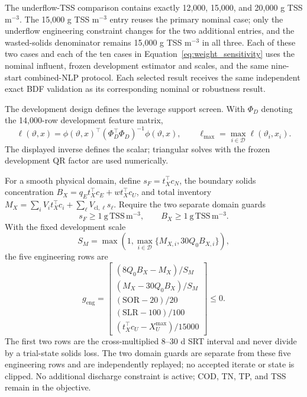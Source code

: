 \documentclass[a4paper,fleqn]{cas-sc}
\begin{document}
The underflow-TSS comparison contains exactly 12,000, 15,000, and 20,000 g TSS m$^{-3}$. The 15,000 g TSS m$^{-3}$ entry reuses the primary nominal case; only the underflow engineering constraint changes for the two additional entries, and the wasted-solids denominator remains 15,000 g TSS m$^{-3}$ in all three. Each of these two cases and each of the ten cases in Equation~\eqref{eq:weight_sensitivity} uses the nominal influent, frozen development estimator and scales, and the same nine-start combined-NLP protocol. Each selected result receives the same independent exact BDF validation as its corresponding nominal or robustness result.

The development design defines the leverage support screen. With $\Phi_D$ denoting the 14,000-row development feature matrix,
\begin{equation}
\label{eq:leverage_screen}
\ell(\vartheta,x)=\phi(\vartheta,x)^\top(\Phi_D^\top\Phi_D)^{-1}\phi(\vartheta,x),
\qquad
\ell_{\max}=\max_{i\in\mathcal D}\ell(\vartheta_i,x_i).
\end{equation}
The displayed inverse defines the scalar; triangular solves with the frozen development QR factor are used numerically.

For a smooth physical domain, define $s_F=t_X^\top c_N$, the boundary solids concentration $B_X=q_Et_X^\top c_E+wt_X^\top c_U$, and total inventory $M_X=\sum_iV_it_X^\top c_i+\sum_\ell V_{\mathrm{cl},\ell}s_\ell$. Require the two separate domain guards
\begin{equation}
\label{eq:srt_domain}
s_F\geq1\ \mathrm{g\,TSS\,m^{-3}},
\qquad B_X\geq1\ \mathrm{g\,TSS\,m^{-3}}.
\end{equation}
With the fixed development scale
\begin{equation}
S_M=\max\!\left(1,\max_{i\in\mathcal D}
\{M_{X,i},30Q_0B_{X,i}\}\right),
\end{equation}
the five engineering rows are
\begin{equation}
\label{eq:engineering_constraints}
g_{\mathrm{eng}}=
\begin{bmatrix}
(8Q_0B_X-M_X)/S_M\\
(M_X-30Q_0B_X)/S_M\\
(\mathrm{SOR}-20)/20\\
(\mathrm{SLR}-100)/100\\
(t_X^\top c_U-X_U^{\max})/15000
\end{bmatrix}\leq0.
\end{equation}
The first two rows are the cross-multiplied 8--30 d SRT interval and never divide by a trial-state solids loss. The two domain guards are separate from these five engineering rows and are independently replayed; no accepted iterate or state is clipped. No additional discharge constraint is active; COD, TN, TP, and TSS remain in the objective.
\end{document}
